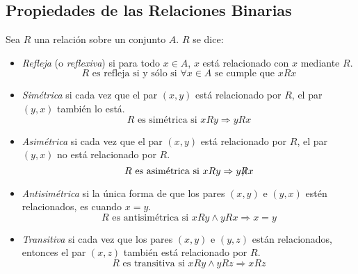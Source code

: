 \subsection{Propiedades de las Relaciones Binarias}
\label{sec:prop-rel}
\begin{definicion}
Sea $R$ una relación sobre un conjunto $A$.
$R$ se dice:
\begin{itemize}
	\item 
	\emph{Refleja} (o \emph{reflexiva}) si para todo $x\in A$, $x$ está relacionado con $x$ mediante $R$.
	\[
	R\text{ es refleja si y sólo si }\forall x\in A\text{ se cumple que }xRx
	\]
	
	\item
	\emph{Simétrica} si cada vez que el par $(x,y)$ está relacionado por $R$, el par $(y,x)$ también lo está.
	\[
	R\text{ es simétrica si }xRy\Rightarrow yRx
	\]
	
	\item
	\emph{Asimétrica} si cada vez que el par $(x,y)$ está relacionado por $R$, el par $(y,x)$ no está relacionado por $R$.
	\[
	R\text{ es asimétrica si }xRy\Rightarrow y\hspace*{-0.3em}\not\hspace*{-0.3em}Rx
	\]
	
	\item
	\emph{Antisimétrica} si la única forma de que los pares $(x,y)$ e $(y,x)$ estén relacionados, es cuando $x=y$.
	\[
	R\text{ es antisimétrica si }xRy\wedge yRx\Rightarrow x=y
	\]
	
	\item
	\emph{Transitiva} si cada vez que los pares $(x,y)$ e $(y,z)$ están relacionados, entonces el par $(x,z)$ también está relacionado por $R$.
	\[
	R\text{ es transitiva si }xRy\wedge yRz\Rightarrow xRz
	\]
\end{itemize}
\end{definicion}
